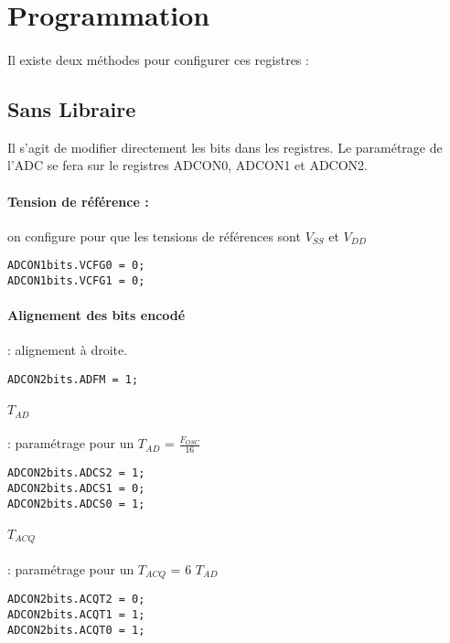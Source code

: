 \section{Programmation}

\paragraph{}
Il existe deux méthodes pour configurer ces registres :

\subsection{Sans Libraire}
Il s'agit de modifier directement les bits dans les registres. Le paramétrage de l'ADC se fera sur le registres ADCON0, ADCON1 et ADCON2.

\paragraph{Tension de référence :} on configure pour que les tensions de références sont  $V_{SS}$ et $V_{DD}$


\begin{lstlisting}
ADCON1bits.VCFG0 = 0;
ADCON1bits.VCFG1 = 0;
\end{lstlisting}

\paragraph{Alignement des bits encodé} : alignement à droite.
\begin{lstlisting}
ADCON2bits.ADFM = 1;
\end{lstlisting}


\paragraph{$T_{AD}$} : paramétrage pour un $T_{AD}$ = $\frac{F_{OSC}}{16}$
\begin{lstlisting}
ADCON2bits.ADCS2 = 1;
ADCON2bits.ADCS1 = 0;
ADCON2bits.ADCS0 = 1;
\end{lstlisting}

\paragraph{$T_{ACQ}$} : paramétrage pour un $T_{ACQ}$ = 6 $T_{AD}$
\begin{lstlisting}
ADCON2bits.ACQT2 = 0;
ADCON2bits.ACQT1 = 1;
ADCON2bits.ACQT0 = 1;
\end{lstlisting}


